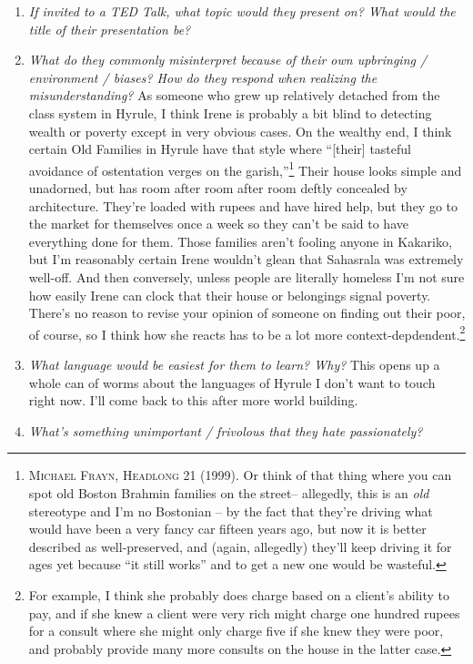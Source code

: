 \begin{enumerate}
    \item \textit{If invited to a TED Talk, what topic would they present on? What would the title of their presentation be?}
      
    \item \textit{What do they commonly misinterpret because of their own upbringing / environment / biases? How do they respond when realizing the misunderstanding?}
      As someone who grew up relatively detached from the class system in Hyrule, I think Irene is probably a bit blind to detecting wealth or poverty except in very obvious cases. On the wealthy end, I think certain Old Families in Hyrule have that style where ``[their] tasteful avoidance of ostentation verges on the garish,''\footnote{\textsc{Michael Frayn, Headlong} 21 (1999). Or think of that thing where you can spot old Boston Brahmin families on the street-- allegedly, this is an \emph{old} stereotype and I'm no Bostonian -- by the fact that they're driving what would have been a very fancy car fifteen years ago, but now it is better described as well-preserved, and (again, allegedly) they'll keep driving it for ages yet  because ``it still works'' and to get a new one would be wasteful.} Their house looks simple and unadorned, but has room after room after room deftly concealed by architecture. They're loaded with rupees and have hired help, but they go to the market for themselves once a week so they can't be said to have everything done for them. Those families aren't fooling anyone in Kakariko, but I'm reasonably certain Irene wouldn't glean that Sahasrala was extremely well-off. And then conversely, unless people are literally homeless I'm not sure how easily Irene can clock that their house or belongings signal poverty. There's no reason to revise your opinion of someone on finding out their poor, of course, so I think how she reacts has to be a lot more context-depdendent.\footnote{For example, I think she probably does charge based on a client's ability to pay, and if she knew a client were very rich might charge one hundred rupees for a consult where she might only charge five if she knew they were poor, and probably provide many more consults on the house in the latter case.}
    \item \textit{What language would be easiest for them to learn? Why?}
      This opens up a whole can of worms about the languages of Hyrule I don't want to touch right now. I'll come back to this after more world building.
    \item \textit{What’s something unimportant / frivolous that they hate passionately?}

\end{enumerate}

